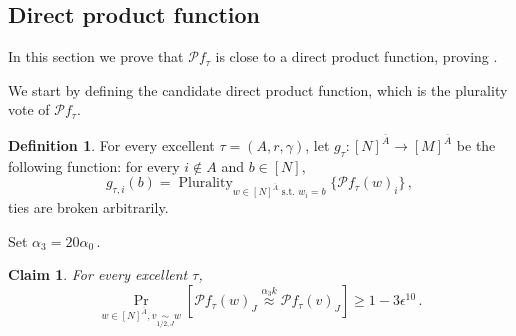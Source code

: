 \documentclass[11pt]{article}
\numberwithin{equation}{section}
\newtheorem{claim}[theorem]{Claim}
\theoremstyle{definition}
\newtheorem{definition}[theorem]{Definition}
\theoremstyle{plain}
\newcommand{\Prob}[2][]{\Pr_{{#1}}\left[#2\right]} %
\newcommand\f{f} %
\newcommand{\g}{g} %
\newcommand\bh{\mathcal{P}\f_\tau} %
\newcommand\neql[1]{\stackrel{{#1}}{ \approx}} %
\newcommand\cor[1]{\underset{\scriptscriptstyle#1}{\sim}} %
\DeclareMathOperator*\plur{\mathrm{Plurality}} %
\begin{document}
\subsection{Direct product function} \label{sec:local close to prod}
In this section we prove that $\bh$ is close to a direct product function, proving .

We start by defining the candidate direct product function, which is the plurality vote of $\bh$.
\begin{definition}\label{def:local dp}
	For every excellent $\tau=(A,r,\gamma)$, let $\g_\tau:[N]^{\bar{A}}\rightarrow[M]^{\bar{A}}$ be the following function: for every $i\notin A$ and $b\in[N]$,
	\[ \g_{{\tau},i}(b) = \plur_{w\in[N]^{\bar{A}} \text{ s.t. }w_i = b}\{\bh(w)_i \} \,,\]%
	ties are broken arbitrarily.
\end{definition}

Set $\alpha_3 = 20\alpha_0$\,.
\begin{claim}\label{claim:local avg consistent}
	For every excellent $\tau$,
	\[ \Prob[{w\in [N]^{\bar{A}},v\cor{1/2,J}{w}}]{\bh(w)_J \neql{\alpha_3 k} \bh(v)_J } \geq 1-3\epsilon^{10}\,. \]%
\end{claim}
\end{document}
